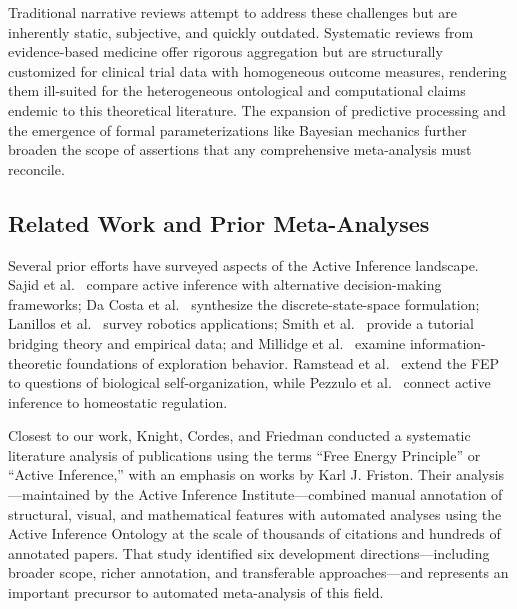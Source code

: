 \documentclass[
]{article}
\begin{document}
Traditional narrative reviews attempt to address these challenges but
are inherently static, subjective, and quickly outdated. Systematic
reviews from evidence-based medicine offer rigorous aggregation but are
structurally customized for clinical trial data with homogeneous outcome
measures, rendering them ill-suited for the heterogeneous ontological
and computational claims endemic to this theoretical literature. The
expansion of predictive processing
\citep{clark2013whatever, hohwy2013predictive} and the emergence of
formal parameterizations like Bayesian mechanics
\citep{sakthivadivel2023bayesian} further broaden the scope of
assertions that any comprehensive meta-analysis must reconcile.

\subsection{Related Work and Prior
Meta-Analyses}\label{related-work-and-prior-meta-analyses}

Several prior efforts have surveyed aspects of the Active Inference
landscape. Sajid et al.~\citep{sajid2021active} compare active inference
with alternative decision-making frameworks; Da Costa et
al.~\citep{dacosta2020active} synthesize the discrete-state-space
formulation; Lanillos et al.~\citep{lanillos2021active} survey robotics
applications; Smith et al.~\citep{smith2021computational} provide a
tutorial bridging theory and empirical data; and Millidge et
al.~\citep{millidge2021understanding} examine information-theoretic
foundations of exploration behavior. Ramstead et
al.~\citep{ramstead2018answering} extend the FEP to questions of
biological self-organization, while Pezzulo et
al.~\citep{pezzulo2015active} connect active inference to homeostatic
regulation.

Closest to our work, Knight, Cordes, and Friedman \citep{knight2022fep}
conducted a systematic literature analysis of publications using the
terms ``Free Energy Principle'' or ``Active Inference,'' with an
emphasis on works by Karl J. Friston. Their analysis---maintained by the
Active Inference Institute---combined manual annotation of structural,
visual, and mathematical features with automated analyses using the
Active Inference Ontology at the scale of thousands of citations and
hundreds of annotated papers. That study identified six development
directions---including broader scope, richer annotation, and
transferable approaches---and represents an important precursor to
automated meta-analysis of this field.
\end{document}
